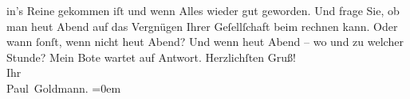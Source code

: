 \begin{ledgroupsized}[t]{13cm}
               in’s Reine gekommen iſt und wenn Alles wieder gut geworden. Und frage Sie, ob man
                  heut{ }Abend auf das Vergnügen Ihrer Geſellſchaft beim \label{K_L02645-2v}\label{K_L02645-2h}
                  rechnen\strikeout{\textcolor{gray}{×}} kann. Oder wann ſonſt, wenn nicht heut{ }Abend? Und wenn heut{ }Abend – wo und zu welcher Stunde?\pend
           \pstart
           Mein Bote wartet auf Antwort.\pend
           \pstart
           Herzlichſten Gruß! {\\[\baselineskip]}Ihr {\\[\baselineskip]}\spacefill\mbox{Paul Goldmann.}\pend
           \leftskip=0em{}\endnumbering{}\end{ledgroupsized}  \newcommand{\dateiname}{L02645}\newcommand{\titel}{Paul Goldmann an Arthur Schnitzler, 1. 12. 1889}\newcommand{\editorInnen}{Martin Anton Müller und Laura Untner}
      